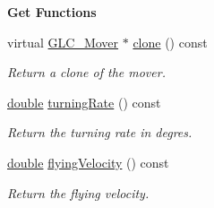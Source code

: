 \begin{Indent}{\bf Get Functions}\par
\begin{DoxyCompactItemize}
\item 
virtual \hyperlink{class_g_l_c___mover}{G\-L\-C\-\_\-\-Mover} $\ast$ \hyperlink{class_g_l_c___fly_mover_ae6ad02a62e32bbc839fe28f9c6c9c532}{clone} () const 
\begin{DoxyCompactList}\small\item\em Return a clone of the mover. \end{DoxyCompactList}\item 
\hyperlink{_super_l_u_support_8h_a8956b2b9f49bf918deed98379d159ca7}{double} \hyperlink{class_g_l_c___fly_mover_adb104d10c421b5138653998ba4f74e2b}{turning\-Rate} () const 
\begin{DoxyCompactList}\small\item\em Return the turning rate in degres. \end{DoxyCompactList}\item 
\hyperlink{_super_l_u_support_8h_a8956b2b9f49bf918deed98379d159ca7}{double} \hyperlink{class_g_l_c___fly_mover_ad325f93ec447b8b73c1ec22f54e5bdfe}{flying\-Velocity} () const 
\begin{DoxyCompactList}\small\item\em Return the flying velocity. \end{DoxyCompactList}\end{DoxyCompactItemize}
\end{Indent}
